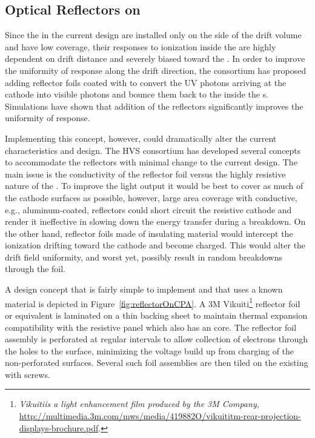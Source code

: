 \subsection{Optical Reflectors on }

Since the  in the current  design are installed only on the  side of the drift volume and have low coverage, their responses to ionization inside the  are highly dependent on drift distance and severely biased toward the .  In order to improve the uniformity of response along the drift direction, the  consortium has proposed adding reflector foils coated with  to convert the UV photons arriving at the cathode into visible photons and bounce them back to the  inside the s.  Simulations have shown that addition of the reflectors  significantly improves the uniformity of response.

Implementing this concept, however, could dramatically alter the current  characteristics and design.  The HVS consortium has %
developed several concepts to accommodate the reflectors with minimal change to the current  design.  The main issue %
is the conductivity of the reflector foil versus the highly resistive nature of the .  To improve the light output it would be best to %
cover as much of the cathode surfaces as possible, however, %
large area coverage with conductive, e.g., aluminum-coated, reflectors could short circuit the resistive cathode and render it ineffective in slowing down the energy transfer during a  breakdown.  On the other hand, %
reflector foils made of insulating material would intercept the ionization drifting toward the cathode and become charged. This would alter the drift field uniformity, and worst yet, possibly result in random breakdowns through the foil.

A design concept that is fairly simple to implement and that uses a known material is depicted in Figure~\ref{fig:reflectorOnCPA}.  A 3M Vikuiti\footnote{\textit{Vikuiti\texttrademark is a light enhancement film produced by the 3M Company},  \url{http://multimedia.3m.com/mws/media/419882O/vikuititm-rear-projection-displays-brochure.pdf}.} 
reflector foil or equivalent is laminated on a thin \frfour backing sheet to maintain thermal expansion compatibility
with the resistive  panel which also has an \frfour core. The reflector foil assembly is perforated at regular intervals to allow %
collection of electrons through the holes to the   surface, minimizing the voltage build up from charging of the non-perforated surfaces.  Several such foil assemblies are then tiled on the existing  with screws.

